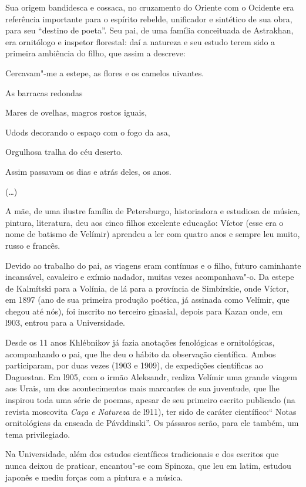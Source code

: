 Sua origem bandidesca e cossaca, no cruzamento do Oriente com o Ocidente
era referência importante para o espírito rebelde, unificador e
sintético de sua obra, para seu ``destino de poeta''. Seu pai, de uma
família conceituada de Astrakhan, era ornitólogo e inspetor florestal:
daí a natureza e seu estudo terem sido a primeira ambiência do filho,
que assim a descreve:

Cercavam"-me a estepe, as flores e os camelos uivantes.

As barracas redondas

Mares de ovelhas, magros rostos iguais,

Udods decorando o espaço com o fogo da asa,

Orgulhosa tralha do céu deserto.

Assim passavam os dias e atrás deles, os anos.

(\ldots{})

A mãe, de uma ilustre família de Petersburgo, historiadora e estudiosa
de música, pintura, literatura, deu aos cinco filhos excelente educação:
Víctor (esse era o nome de batismo de Velímir) aprendeu a ler com quatro
anos e sempre leu muito, russo e francês.

Devido ao trabalho do pai, as viagens eram contínuas e o filho, futuro
caminhante incansável, cavaleiro e exímio nadador, muitas vezes
acompanhava"-o. Da estepe de Kalmítski para a Volínia, de lá para a
província de Simbírskie, onde Víctor, em 1897 (ano de sua primeira
produção poética, já assinada como Velímir, que chegou até nós), foi
inscrito no terceiro ginasial, depois para Kazan onde, em l903, entrou
para a Universidade.

Desde os 11 anos Khlébnikov já fazia anotações fenológicas e
ornitológicas, acompanhando o pai, que lhe deu o hábito da observação
científica. Ambos participaram, por duas vezes (1903 e 1909), de
expedições científicas ao Daguestan. Em l905, com o irmão Aleksandr,
realiza Velímir uma grande viagem aos Urais, um dos acontecimentos mais
marcantes de sua juventude, que lhe inspirou toda uma série de poemas,
apesar de seu primeiro escrito publicado (na revista moscovita
\emph{Caça e Natureza} de l911), ter sido de caráter científico:`` Notas
ornitológicas da enseada de Pávddinski''. Os pássaros serão, para ele
também, um tema privilegiado.

Na Universidade, além dos estudos científicos tradicionais e dos
escritos que nunca deixou de praticar, encantou"-se com Spinoza, que leu
em latim, estudou japonês e mediu forças com a pintura e a música.

